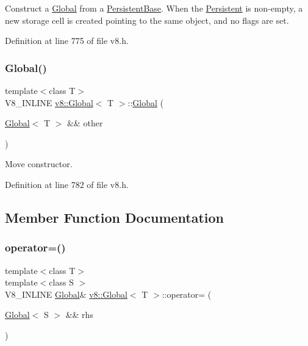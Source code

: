 Construct a \mbox{\hyperlink{classv8_1_1Global}{Global}} from a \mbox{\hyperlink{classv8_1_1PersistentBase}{Persistent\+Base}}. When the \mbox{\hyperlink{classv8_1_1Persistent}{Persistent}} is non-\/empty, a new storage cell is created pointing to the same object, and no flags are set. 

Definition at line 775 of file v8.\+h.

\mbox{\label{classv8_1_1Global_ab8f3c754a58146e6db67012cd74a49cb}} 
\subsubsection{\texorpdfstring{Global()}{Global()}\hspace{0.1cm}{\footnotesize\ttfamily [4/4]}}
{\footnotesize\ttfamily template$<$class T$>$ \\
V8\+\_\+\+I\+N\+L\+I\+NE \mbox{\hyperlink{classv8_1_1Global}{v8\+::\+Global}}$<$ T $>$\+::\mbox{\hyperlink{classv8_1_1Global}{Global}} (\begin{DoxyParamCaption}\item[{\mbox{\hyperlink{classv8_1_1Global}{Global}}$<$ T $>$ \&\&}]{other }\end{DoxyParamCaption})\hspace{0.3cm}{\ttfamily [inline]}}

Move constructor. 

Definition at line 782 of file v8.\+h.



\subsection{Member Function Documentation}
\mbox{\label{classv8_1_1Global_a9d3d7d8f10ad23e413f2027cc15ab209}} 
\subsubsection{\texorpdfstring{operator=()}{operator=()}}
{\footnotesize\ttfamily template$<$class T$>$ \\
template$<$class S $>$ \\
V8\+\_\+\+I\+N\+L\+I\+NE \mbox{\hyperlink{classv8_1_1Global}{Global}}\& \mbox{\hyperlink{classv8_1_1Global}{v8\+::\+Global}}$<$ T $>$\+::operator= (\begin{DoxyParamCaption}\item[{\mbox{\hyperlink{classv8_1_1Global}{Global}}$<$ S $>$ \&\&}]{rhs }\end{DoxyParamCaption})\hspace{0.3cm}{\ttfamily [inline]}}

